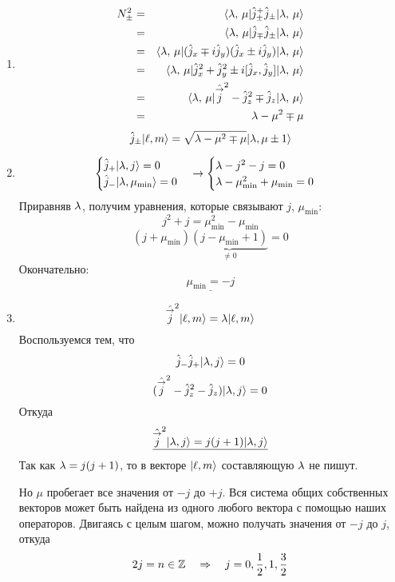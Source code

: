 \begin{enumerate}
  \item %
\def \jmp {\Hat j_\mp}
\begin{eqnarray*}
    N_\pm^2 &=& \qtri{\lmu}{\jpm^+ \jpm}{\lmu}\\
    &=& \qtri{\lmu}{\jmp \jpm}{\lmu}\\
    &=& \qtri{\lmu}{ (\jx \mp i \jy)(\jx \pm i \jy) }{\lmu}\\
    &=& \qtri{\lmu}{ \jx^2 + \jy^2 \pm i [\jx, \jy] }{\lmu}\\
    &=& \qtri{\lmu}{\jsq - \jz^2 \mp \jz}{\lmu}\\
    &=& \lam - \mu^2 \mp \mu
\end{eqnarray*}
$$
    {\hat j}_\pm | \ell, m \rangle = \sqrt{\lambda - \mu^2 \mp \mu} | \lambda, \mu \pm 1 \rangle
$$

  \item %
$$
    \begin{cases}
        \Hat j_+ | \lambda, j \rangle = 0\\
        \Hat j_- | \lambda, \mu_{\min} \rangle = 0
    \end{cases}
    \to
    \begin{cases}
        \lambda - j^2 - j = 0\\
        \lambda - \mu_{\min}^2 + \mu_{\min} = 0
    \end{cases}
$$
Приравняв $\lambda$, получим уравнения, которые связывают $j$, $\mu_{\min}$:
$$
    j^2 + j = \mu_{\min}^2 - \mu_{\min}
$$
$$
    (j + \mu_{\min})\underbrace{(j - \mu_{\min} + 1)}_{\neq 0} = 0
$$
Окончательно:
$$
\underline{    \mu_{\min} = -j}
$$

  \item %
$$
    {\hat{\overset{\to}{j}}}^2 | \ell, m \rangle = \lambda | \ell, m \rangle
$$
Воспользуемся тем, что
$$
    \Hat j_- \Hat j_+ | \lambda, j \rangle = 0
$$
$$
    ({\hat{\overset{\to}{j}}}^2 - \Hat j_z^2 - \Hat j_z) | \lambda, j \rangle = 0
$$
Откуда
$$
\underline{    {\hat{\overset{\to}{j}}}^2 | \lambda, j \rangle = j(j+1) | \lambda, j \rangle}
$$
Так как $\lambda = j(j+1)$, то в векторе $| \ell, m \rangle$ составляющую $\lambda$ не пишут.

Но $\mu$ пробегает все значения от $-j$ до $+j$. Вся система общих собственных векторов может быть найдена из одного любого вектора с помощью наших операторов. Двигаясь с целым шагом, можно получать значения от $-j$ до $j$, откуда
$$
    2j = n \in \mathbb{Z} \quad \Rightarrow \quad j = 0, \dfrac12, 1, \dfrac32
$$


\end{enumerate}

